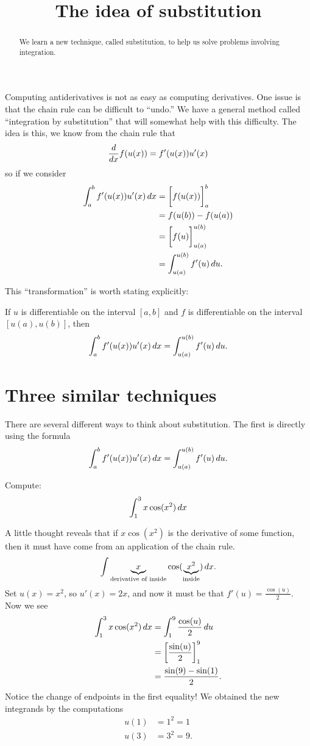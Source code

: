 \documentclass{ximera}
\title[Dig-In:]{The idea of substitution}
\begin{document}
\begin{abstract}
  We learn a new technique, called substitution, to help us solve
  problems involving integration.
\end{abstract}
\maketitle


Computing antiderivatives is not as easy as computing derivatives.
One issue is that the chain rule can be difficult to ``undo.''  We
have a general method called ``integration by substitution'' that will
somewhat help with this difficulty. The idea is this, we know from the
chain rule that
\[
\frac{d}{\mathop{}\!d x} f(u(x)) = f'(u(x))u'(x)
\]
so if we consider
\begin{align*}
  \int_a^b f'(u(x))u'(x) \mathop{}\!d x &= \bigg[ f(u(x)) \bigg]_a^b \\
  &= f(u(b)) - f(u(a)) \\
  &= \bigg[ f(u) \bigg]_{u(a)}^{u(b)}\\
  &= \int_{u(a)}^{u(b)}f'(u) \mathop{}\!d u.
\end{align*}

This ``transformation'' is worth stating explicitly:

\begin{theorem} 
If $u$ is differentiable on the interval $[a,b]$ and $f$ is
differentiable on the interval $[u(a),u(b)]$, then
\[
\int_a^b f'(u(x)) u'(x) \mathop{}\!d x =\int_{u(a)}^{u(b)} f'(u) \mathop{}\!d u.
\]
\end{theorem}

\section{Three similar techniques}

There are several different ways to think about substitution. The
first is directly using the formula
\[
\int_a^b f'(u(x)) u'(x) \mathop{}\!d x = \int_{u(a)}^{u(b)} f'(u) \mathop{}\!d u.
\]
\begin{example}
Compute:
\[
\int_1^3 x\cos(x^2)\mathop{}\!d x
\]
\begin{explanation}
A little thought reveals that if $x\cos(x^2)$ is the derivative of
some function, then it must have come from an application of the chain
rule. 
\[
\int \underbrace{x}_{\text{derivative of inside}}\cos(\underbrace{x^2}_{\text{inside}})\mathop{}\!d x.
\]
Set $u(x) = x^2$, so $u'(x) = 2x$, and now it must be that $f'(u) =
\frac{\cos(u)}{2}$. Now we see
\begin{align*}
\int_1^3 x\cos(x^2)\mathop{}\!d x &= \int_1^9 \frac{\cos(u)}{2}\mathop{}\!d u\\
&= \bigg[ \frac{\sin(u)}{2} \bigg]_1^9 \\
&= \frac{\sin(9) -\sin(1)}{2}.
\end{align*}
Notice the change of endpoints in the first equality!  
We obtained the new integrands by the computations
\begin{align*}
u(1) &= 1^2 = 1  \\
u(3) &= 3^2 = 9.
\end{align*}
\end{explanation}
\end{example}
\end{document}
